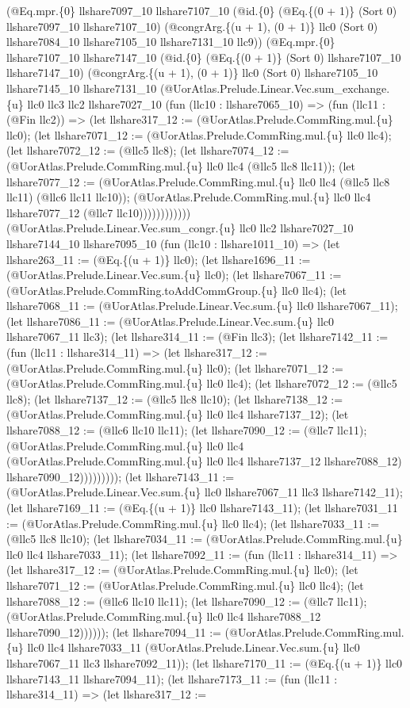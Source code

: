 \documentclass[11pt]{article}
\begin{document}
(@Eq.mpr.\{0\} llshare7097\_10 llshare7107\_10 (@id.\{0\} (@Eq.\{(0 + 1)\} (Sort 0) llshare7097\_10 llshare7107\_10) (@congrArg.\{(u + 1), (0 + 1)\} llc0 (Sort 0) llshare7084\_10 llshare7105\_10 llshare7131\_10 llc9)) (@Eq.mpr.\{0\} llshare7107\_10 llshare7147\_10 (@id.\{0\} (@Eq.\{(0 + 1)\} (Sort 0) llshare7107\_10 llshare7147\_10) (@congrArg.\{(u + 1), (0 + 1)\} llc0 (Sort 0) llshare7105\_10 llshare7145\_10 llshare7131\_10 (@UorAtlas.Prelude.Linear.Vec.sum\_exchange.\{u\} llc0 llc3 llc2 llshare7027\_10 (fun (llc10 : llshare7065\_10) => (fun (llc11 : (@Fin llc2)) => (let llshare317\_12 := (@UorAtlas.Prelude.CommRing.mul.\{u\} llc0); (let llshare7071\_12 := (@UorAtlas.Prelude.CommRing.mul.\{u\} llc0 llc4); (let llshare7072\_12 := (@llc5 llc8); (let llshare7074\_12 := (@UorAtlas.Prelude.CommRing.mul.\{u\} llc0 llc4 (@llc5 llc8 llc11)); (let llshare7077\_12 := (@UorAtlas.Prelude.CommRing.mul.\{u\} llc0 llc4 (@llc5 llc8 llc11) (@llc6 llc11 llc10)); (@UorAtlas.Prelude.CommRing.mul.\{u\} llc0 llc4 llshare7077\_12 (@llc7 llc10)))))))))))) (@UorAtlas.Prelude.Linear.Vec.sum\_congr.\{u\} llc0 llc2 llshare7027\_10 llshare7144\_10 llshare7095\_10 (fun (llc10 : llshare1011\_10) => (let llshare263\_11 := (@Eq.\{(u + 1)\} llc0); (let llshare1696\_11 := (@UorAtlas.Prelude.Linear.Vec.sum.\{u\} llc0); (let llshare7067\_11 := (@UorAtlas.Prelude.CommRing.toAddCommGroup.\{u\} llc0 llc4); (let llshare7068\_11 := (@UorAtlas.Prelude.Linear.Vec.sum.\{u\} llc0 llshare7067\_11); (let llshare7086\_11 := (@UorAtlas.Prelude.Linear.Vec.sum.\{u\} llc0 llshare7067\_11 llc3); (let llshare314\_11 := (@Fin llc3); (let llshare7142\_11 := (fun (llc11 : llshare314\_11) => (let llshare317\_12 := (@UorAtlas.Prelude.CommRing.mul.\{u\} llc0); (let llshare7071\_12 := (@UorAtlas.Prelude.CommRing.mul.\{u\} llc0 llc4); (let llshare7072\_12 := (@llc5 llc8); (let llshare7137\_12 := (@llc5 llc8 llc10); (let llshare7138\_12 := (@UorAtlas.Prelude.CommRing.mul.\{u\} llc0 llc4 llshare7137\_12); (let llshare7088\_12 := (@llc6 llc10 llc11); (let llshare7090\_12 := (@llc7 llc11); (@UorAtlas.Prelude.CommRing.mul.\{u\} llc0 llc4 (@UorAtlas.Prelude.CommRing.mul.\{u\} llc0 llc4 llshare7137\_12 llshare7088\_12) llshare7090\_12))))))))); (let llshare7143\_11 := (@UorAtlas.Prelude.Linear.Vec.sum.\{u\} llc0 llshare7067\_11 llc3 llshare7142\_11); (let llshare7169\_11 := (@Eq.\{(u + 1)\} llc0 llshare7143\_11); (let llshare7031\_11 := (@UorAtlas.Prelude.CommRing.mul.\{u\} llc0 llc4); (let llshare7033\_11 := (@llc5 llc8 llc10); (let llshare7034\_11 := (@UorAtlas.Prelude.CommRing.mul.\{u\} llc0 llc4 llshare7033\_11); (let llshare7092\_11 := (fun (llc11 : llshare314\_11) => (let llshare317\_12 := (@UorAtlas.Prelude.CommRing.mul.\{u\} llc0); (let llshare7071\_12 := (@UorAtlas.Prelude.CommRing.mul.\{u\} llc0 llc4); (let llshare7088\_12 := (@llc6 llc10 llc11); (let llshare7090\_12 := (@llc7 llc11); (@UorAtlas.Prelude.CommRing.mul.\{u\} llc0 llc4 llshare7088\_12 llshare7090\_12)))))); (let llshare7094\_11 := (@UorAtlas.Prelude.CommRing.mul.\{u\} llc0 llc4 llshare7033\_11 (@UorAtlas.Prelude.Linear.Vec.sum.\{u\} llc0 llshare7067\_11 llc3 llshare7092\_11)); (let llshare7170\_11 := (@Eq.\{(u + 1)\} llc0 llshare7143\_11 llshare7094\_11); (let llshare7173\_11 := (fun (llc11 : llshare314\_11) => (let llshare317\_12 := 
\end{document}
